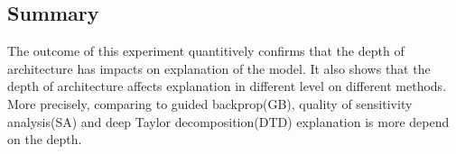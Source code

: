 \subsection{Summary}
The outcome of this experiment quantitively confirms that the depth of architecture has impacts on explanation of the model. It also shows that  the depth of architecture affects explanation in different level on different methods. More precisely, comparing to guided backprop(GB), quality of sensitivity analysis(SA) and deep Taylor decomposition(DTD) explanation is more depend on the depth.


